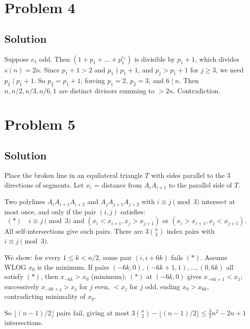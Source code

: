\documentclass{article}
\begin{document}
\section*{Problem 4}
\subsection*{Solution}
Suppose $e_1$ odd. Then $(1 + p_1 + \dots + p_1^{e_1})$ is divisible by $p_1 + 1$, which divides $s(n) = 2n$. Since $p_1 + 1 > 2$ and $p_1 \nmid p_1+1$, and $p_j > p_1+1$ for $j \ge 3$, we need $p_2 \mid p_1+1$. So $p_2 = p_1 + 1$, forcing $p_1 = 2$, $p_2 = 3$, and $6 \mid n$. Then $n, n/2, n/3, n/6, 1$ are distinct divisors summing to $> 2n$. Contradiction.

\section*{Problem 5}
\subsection*{Solution}
Place the broken line in an equilateral triangle $T$ with sides parallel to the $3$ directions of segments. Let $x_i$ = distance from $A_i A_{i+1}$ to the parallel side of $T$.

Two polylines $A_i A_{i+1} A_{i+2}$ and $A_j A_{j+1} A_{j+2}$ with $i \equiv j \pmod 3$ intersect at most once, and only if the pair $(i,j)$ satisfies:
\[ (*) \quad i \equiv j \pmod 3 \text{ and } (x_i < x_{i+1}, x_j > x_{j+1}) \text{ or } (x_i > x_{i+1}, x_j < x_{j+1}). \]
All self-intersections give such pairs. There are $3\binom{n}{2}$ index pairs with $i \equiv j \pmod 3$.

We show: for every $1 \le k < n/2$, some pair $(i, i+6k)$ fails $(*)$. Assume WLOG $x_0$ is the minimum. If pairs $(-6k, 0), (-6k+1, 1), \dots, (0, 6k)$ all satisfy $(*)$, then $x_{-6k} > x_0$ (minimum); $(*)$ at $(-6k, 0)$ gives $x_{-6k+1} < x_1$; successively $x_{-6k+j} > x_j$ for $j$ even, $< x_j$ for $j$ odd, ending $x_0 > x_{6k}$, contradicting minimality of $x_0$.

So $\lfloor (n-1)/2 \rfloor$ pairs fail, giving at most $3\binom{n}{2} - \lfloor(n-1)/2\rfloor \le \tfrac{3}{2} n^2 - 2n + 1$ intersections.
\end{document}
